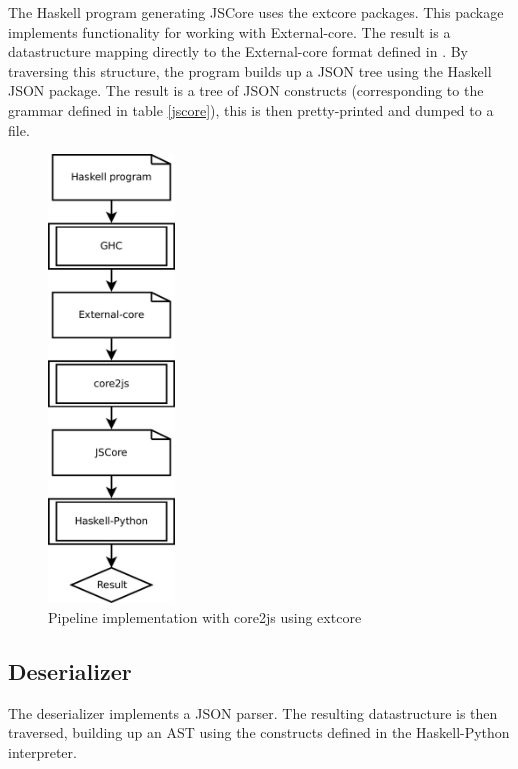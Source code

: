 The Haskell program generating JSCore uses the extcore packages. This package
implements functionality for working with External-core. The result is a datastructure
mapping directly to the External-core format defined in \cite{tolmach2010ghc}. By traversing
this structure, the program builds up a JSON tree using the Haskell JSON package.
The result is a tree of JSON constructs (corresponding to the grammar defined 
in table \ref{jscore}), this is then pretty-printed and dumped to a file.

\begin{figure}[H]
\begin{center}
\includegraphics[width=0.3\textwidth]{diags/pipe_w_core2js}
\caption[Pipeline with core2js]{Pipeline implementation with core2js using extcore}
\label{core2js}
\end{center}
\end{figure}

\subsection{Deserializer}

The deserializer implements a JSON parser. The resulting datastructure is then traversed, building up
an AST using the constructs defined in the Haskell-Python interpreter. 

